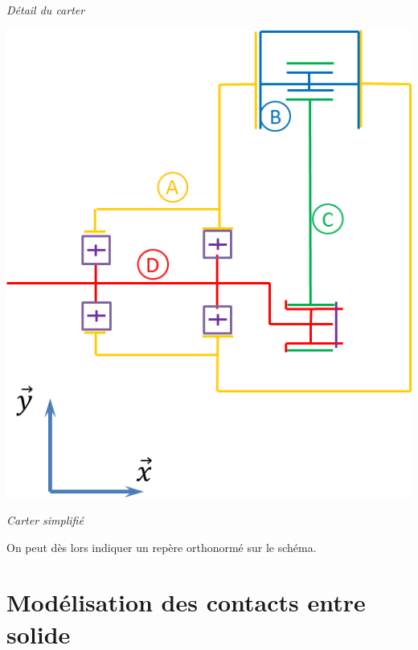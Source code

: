 \documentclass[10pt,oneside]{article}
\begin{document}
{\begin{minipage}[b]{.45\linewidth}
\begin{center}
\textit{Détail du carter}
\end{center}
\end{minipage}\hfill
\begin{minipage}[b]{.45\linewidth}
\begin{center}
\includegraphics[width=.95\textwidth]{png/techno_2}

\textit{Carter simplifié}
\end{center}
\end{minipage}
}{%
}


\begin{rem}
On peut dès lors indiquer un repère orthonormé sur le schéma. 
\end{rem}
\section{Modélisation des contacts entre solide}
\end{document}
